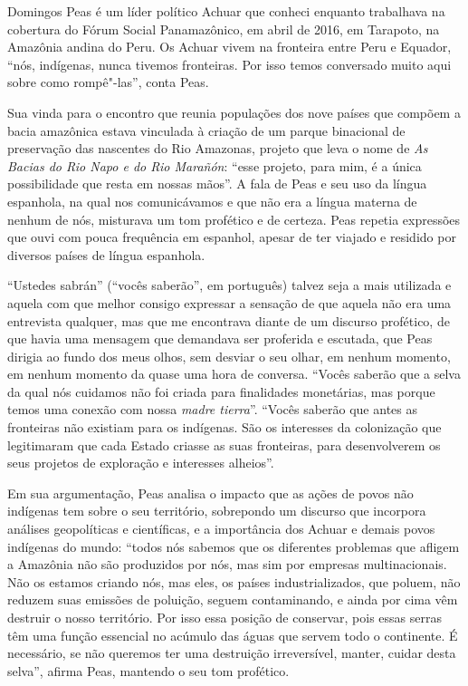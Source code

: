 \asterisc

Domingos Peas é um líder político Achuar que conheci enquanto trabalhava
na cobertura do Fórum Social Panamazônico, em abril de 2016, em
Tarapoto, na Amazônia andina do Peru. Os Achuar vivem na fronteira entre
Peru e Equador, ``nós, indígenas, nunca tivemos fronteiras. Por isso
temos conversado muito aqui sobre como rompê"-las'', conta Peas.

Sua vinda para o encontro que reunia populações dos nove países que
compõem a bacia amazônica estava vinculada à criação de um parque
binacional de preservação das nascentes do Rio Amazonas, projeto que
leva o nome de \emph{As Bacias do Rio Napo e do Rio Marañón}: ``esse
projeto, para mim, é a única possibilidade que resta em nossas mãos''. A
fala de Peas e seu uso da língua espanhola, na qual nos comunicávamos e
que não era a língua materna de nenhum de nós, misturava um tom
profético e de certeza. Peas repetia expressões que ouvi com pouca
frequência em espanhol, apesar de ter viajado e residido por diversos
países de língua espanhola.

``Ustedes sabrán'' (``vocês saberão'', em português) talvez seja a
mais utilizada e aquela com que melhor consigo expressar a
sensação de que aquela não era uma entrevista qualquer, mas que me
encontrava diante de um discurso profético, de que havia uma mensagem
que demandava ser proferida e escutada, que Peas dirigia ao fundo dos
meus olhos, sem desviar o seu olhar, em nenhum momento, em nenhum
momento da quase uma hora de conversa. ``Vocês saberão que a selva da
qual nós cuidamos não foi criada para finalidades monetárias, mas porque
temos uma conexão com nossa \emph{madre tierra}''. ``Vocês saberão que
antes as fronteiras não existiam para os indígenas. São os interesses da
colonização que legitimaram que cada Estado criasse as suas fronteiras,
para desenvolverem os seus projetos de exploração e interesses
alheios''.

Em sua argumentação, Peas analisa o impacto que as ações de povos
não indígenas tem sobre o seu território, sobrepondo um discurso que
incorpora análises geopolíticas e científicas, e a importância
dos Achuar e demais povos indígenas do mundo: ``todos nós
sabemos que os diferentes problemas que afligem a Amazônia não são
produzidos por nós, mas sim por empresas multinacionais. Não os estamos
criando nós, mas eles, os países industrializados, que poluem, não
reduzem suas emissões de poluição, seguem contaminando, e ainda por cima
vêm destruir o nosso território. Por isso essa posição de conservar,
pois essas serras têm uma função essencial no acúmulo das águas que
servem todo o continente. É necessário, se não queremos ter uma
destruição irreversível, manter, cuidar desta selva'', afirma Peas,
mantendo o seu tom profético.


